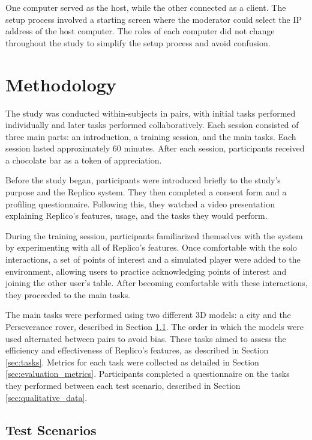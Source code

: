    One computer served as the host, while the other connected as a client. The setup process involved a starting screen where the moderator could select the IP address of the host computer. The roles of each computer did not change throughout the study to simplify the setup process and avoid confusion.

\section{Methodology}

    The study was conducted within-subjects in pairs, with initial tasks performed individually and later tasks performed collaboratively. Each session consisted of three main parts: an introduction, a training session, and the main tasks. Each session lasted approximately 60 minutes. After each session, participants received a chocolate bar as a token of appreciation.

    Before the study began, participants were introduced briefly to the study's purpose and the Replico system. They then completed a consent form and a profiling questionnaire. Following this, they watched a video presentation explaining Replico's features, usage, and the tasks they would perform.

    During the training session, participants familiarized themselves with the system by experimenting with all of Replico's features. Once comfortable with the solo interactions, a set of points of interest and a simulated player were added to the environment, allowing users to practice acknowledging points of interest and joining the other user's table. After becoming comfortable with these interactions, they proceeded to the main tasks.

    The main tasks were performed using two different 3D models: a city and the Perseverance rover, described in Section \ref{sec:test_scenarios}. The order in which the models were used alternated between pairs to avoid bias. These tasks aimed to assess the efficiency and effectiveness of Replico's features, as described in Section \ref{sec:tasks}. Metrics for each task were collected as detailed in Section \ref{sec:evaluation_metrics}. Participants completed a questionnaire on the tasks they performed between each test scenario, described in Section \ref{sec:qualitative_data}.

    \subsection{Test Scenarios} \label{sec:test_scenarios}

